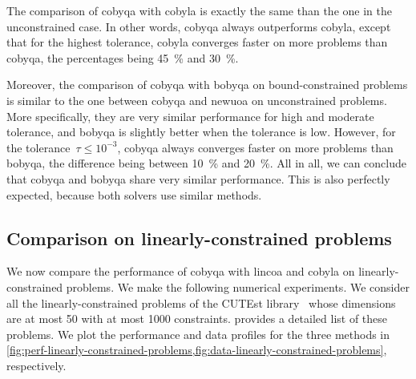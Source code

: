 The comparison of \gls{cobyqa} with \gls{cobyla} is exactly the same than the one in the unconstrained case.
In other words, \gls{cobyqa} always outperforms \gls{cobyla}, except that for the highest tolerance, \gls{cobyla} converges faster on more problems than \gls{cobyqa}, the percentages being \SI{45}{\percent} and \SI{30}{\percent}.

Moreover, the comparison of \gls{cobyqa} with \gls{bobyqa} on bound-constrained problems is similar to the one between \gls{cobyqa} and \gls{newuoa} on unconstrained problems.
More specifically, they are very similar performance for high and moderate tolerance, and \gls{bobyqa} is slightly better when the tolerance is low.
However, for the tolerance~$\tau \le 10^{-3}$, \gls{cobyqa} always converges faster on more problems than \gls{bobyqa}, the difference being between \SI{10}{\percent} and \SI{20}{\percent}.
All in all, we can conclude that \gls{cobyqa} and \gls{bobyqa} share very similar performance.
This is also perfectly expected, because both solvers use similar methods.

\subsection{Comparison on linearly-constrained problems}
\label{subsec:comparison-cobyqa-lincoa}

We now compare the performance of \gls{cobyqa} with \gls{lincoa} and \gls{cobyla} on linearly-constrained problems.
We make the following numerical experiments.
We consider all the linearly-constrained problems of the CUTEst library~\cite{Gould_Orban_Toint_2015} whose dimensions are at most \num{50} with at most \num[group-minimum-digits=4]{1000} constraints.
 provides a detailed list of these problems.
We plot the performance and data profiles for the three methods in \cref{fig:perf-linearly-constrained-problems,fig:data-linearly-constrained-problems}, respectively.

